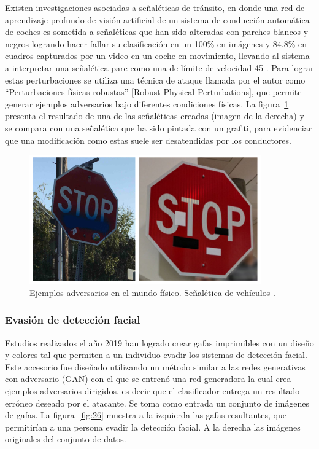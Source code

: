 Existen investigaciones asociadas a señaléticas de tránsito, en donde una red de aprendizaje profundo de visión artificial de un sistema de conducción automática de coches es sometida a señaléticas que han sido alteradas con parches blancos y negros logrando hacer fallar su clasificación en un 100\% en imágenes y 84.8\% en cuadros capturados por un video en un coche en movimiento,  llevando al sistema a interpretar una señalética pare como una de límite de velocidad 45 \parencite{r54}. Para lograr estas perturbaciones se utiliza una técnica de ataque llamada por el autor como “Perturbaciones físicas robustas” [Robust Physical Perturbations], que permite generar ejemplos adversarios bajo diferentes condiciones físicas. La figura~\ref{fig:25} presenta el resultado de una de las señaléticas creadas (imagen de la derecha) y se compara con una señalética que ha sido pintada con un grafiti, para evidenciar que una modificación como estas suele ser desatendidas por los conductores.

\begin{figure}[th]
\centering
\includegraphics [scale = 1] {Figures/figura_25.PNG}
\decoRule
\caption[Ejemplos adversarios en el mundo físico. Señalética de vehículos]{Ejemplos adversarios en el mundo físico. Señalética de vehículos \parencite{r54}.}
\label{fig:25}
\end{figure}

\subsubsection{Evasión de detección facial}

Estudios realizados el año 2019 \parencite{r56} han logrado crear gafas imprimibles con un diseño y colores tal que permiten a un individuo evadir los sistemas de detección facial. Este accesorio fue diseñado utilizando un método similar a las redes generativas con adversario (GAN) con el que se entrenó una red generadora la cual crea ejemplos adversarios dirigidos, es decir que el clasificador entrega un resultado erróneo deseado por el atacante. Se toma como entrada un conjunto de imágenes de gafas. La figura~\ref{fig:26} muestra a la izquierda las gafas resultantes, que permitirían a una persona evadir la detección facial. A la derecha las imágenes originales del conjunto de datos.

